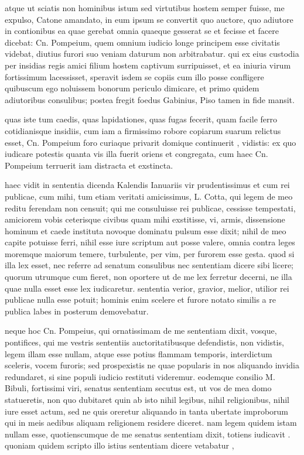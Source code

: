  atque ut sciatis non hominibus istum sed virtutibus hostem semper fuisse, me expulso, Catone amandato, in eum ipsum se convertit quo auctore, quo adiutore in contionibus ea quae gerebat omnia quaeque gesserat se et fecisse et facere dicebat: Cn. Pompeium, quem omnium iudicio longe principem esse civitatis videbat, diutius furori suo veniam daturum non arbitrabatur. qui ex eius custodia per insidias regis amici filium hostem captivum surripuisset, et ea iniuria virum fortissimum lacessisset, speravit isdem se copiis cum illo posse confligere quibuscum ego noluissem bonorum periculo dimicare, et primo quidem adiutoribus consulibus; postea fregit foedus Gabinius, Piso tamen in fide mansit.

 quas iste tum caedis, quas lapidationes, quas fugas fecerit, quam facile ferro cotidianisque insidiis, cum iam a firmissimo robore copiarum suarum relictus esset, Cn. Pompeium foro curiaque privarit domique continuerit , vidistis: ex quo iudicare potestis quanta vis illa fuerit oriens et congregata, cum haec Cn. Pompeium terruerit iam distracta et exstincta.

 haec vidit in sententia dicenda Kalendis Ianuariis vir prudentissimus et cum rei publicae, cum mihi, tum etiam veritati amicissimus, L. Cotta, qui legem de meo reditu ferendam non censuit; qui me consuluisse rei publicae, cessisse tempestati, amiciorem vobis ceterisque civibus quam mihi exstitisse, vi, armis, dissensione hominum et caede instituta novoque dominatu pulsum esse dixit; nihil de meo capite potuisse ferri, nihil esse iure scriptum aut posse valere, omnia contra leges moremque maiorum temere, turbulente, per vim, per furorem esse gesta. quod si illa lex esset, nec referre ad senatum consulibus nec sententiam dicere sibi licere; quorum utrumque cum fieret, non oportere ut de me lex ferretur decerni, ne illa quae nulla esset esse lex iudicaretur. sententia verior, gravior, melior, utilior rei publicae nulla esse potuit; hominis enim scelere et furore notato similis a re publica labes in posterum demovebatur.

 neque hoc Cn. Pompeius, qui ornatissimam de me sententiam dixit, vosque, pontifices, qui me vestris sententiis auctoritatibusque defendistis, non vidistis, legem illam esse nullam, atque esse potius flammam temporis, interdictum sceleris, vocem furoris; sed prospexistis ne quae popularis in nos aliquando invidia redundaret, si sine populi iudicio restituti videremur. eodemque consilio M. Bibuli, fortissimi viri, senatus sententiam secutus est, ut vos de mea domo statueretis, non quo dubitaret quin ab isto nihil legibus, nihil religionibus, nihil iure esset actum, sed ne quis oreretur aliquando in tanta ubertate improborum qui in meis aedibus aliquam religionem residere diceret. nam legem quidem istam nullam esse, quotienscumque de me senatus sententiam dixit, totiens iudicavit . quoniam quidem scripto illo istius sententiam dicere vetabatur ,

